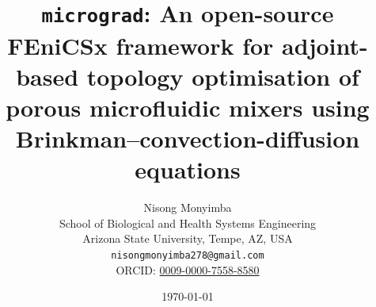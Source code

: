 \documentclass[12pt,a4paper]{article}
\title{\texttt{micrograd}: An open-source FEniCSx framework for adjoint-based topology optimisation of porous microfluidic mixers using Brinkman--convection-diffusion equations}
\author{Nisong Monyimba\\
\small School of Biological and Health Systems Engineering\\
\small Arizona State University, Tempe, AZ, USA\\
\small \texttt{nisongmonyimba278@gmail.com}\\
\small ORCID: \href{https://orcid.org/0009-0000-7558-8580}{0009-0000-7558-8580}
}
\date{\today}
\begin{document}
\maketitle

\begin{abstract}

\end{abstract}









\appendix





\end{document}
